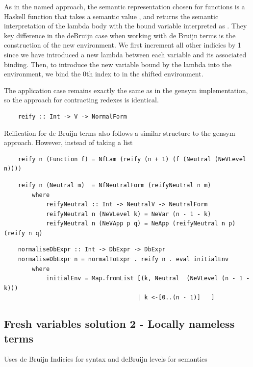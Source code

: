 As in the named approach, the semantic representation chosen for functions is a Haskell function that takes a semantic value , and returns the semantic interpretation of the lambda body with the bound variable interpreted as . They key difference in the deBruijn case when working with de Bruijn terms is the construction of the new environment. We first increment all other indicies by 1 since we have introduced a new lambda between each variable and its associated binding. Then, to introduce the new variable bound by the lambda into the environment, we bind the 0th index to  in the shifted environment.

The application case remains exactly the same as in the gensym implementation, so the approach for contracting redexes is identical.

\begin{lstlisting}
    reify :: Int -> V -> NormalForm
\end{lstlisting}

Reification for de Bruijn terms also follows a similar structure to the gensym approach. However, instead of taking a list 


\begin{lstlisting}
    reify n (Function f) = NfLam (reify (n + 1) (f (Neutral (NeVLevel n))))
\end{lstlisting}

\begin{lstlisting}
    reify n (Neutral m)  = NfNeutralForm (reifyNeutral n m)
        where 
            reifyNeutral :: Int -> NeutralV -> NeutralForm
            reifyNeutral n (NeVLevel k) = NeVar (n - 1 - k)
            reifyNeutral n (NeVApp p q) = NeApp (reifyNeutral n p) (reify n q)
\end{lstlisting}

\begin{lstlisting}
    normaliseDbExpr :: Int -> DbExpr -> DbExpr
    normaliseDbExpr n = normalToExpr . reify n . eval initialEnv 
        where
            initialEnv = Map.fromList [(k, Neutral  (NeVLevel (n - 1 - k))) 
                                      | k <-[0..(n - 1)]   ] 
\end{lstlisting}

\subsection{Fresh variables solution 2 - Locally nameless terms}

Uses de Bruijn Indicies for syntax and deBruijn levels for semantics



